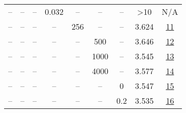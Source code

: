 \begin{table}[H]
\begin{tabular}{ccccccccc}
-- & -- & -- & 0.032 & -- & -- & -- & >10 & N/A \\
-- & -- & -- & -- & 256 & -- & -- & 3.624 & \href{https://wandb.ai/stanford-mercury/optimizer-scaling/runs/sweep-130m-2B-nadamw702024lr0.008-wd0.1-minlr0-warmup2000-b10.95-a5ebd4}{11} \\
-- & -- & -- & -- & -- & 500 & -- & 3.646 & \href{https://wandb.ai/stanford-mercury/optimizer-scaling/runs/sweep-130m-2B-nadamw25143blr0.008-wd0.1-minlr0-warmup500-b10.95--79c4c9}{12} \\
-- & -- & -- & -- & -- & 1000 & -- & 3.545 & \href{https://wandb.ai/stanford-mercury/optimizer-scaling/runs/sweep-130m-2B-nadamw973c1flr0.008-wd0.1-minlr0-warmup1000-b10.95-1c7190}{13} \\
-- & -- & -- & -- & -- & 4000 & -- & 3.577 & \href{https://wandb.ai/stanford-mercury/optimizer-scaling/runs/sweep-130m-2B-nadamw4becd7lr0.008-wd0.1-minlr0-warmup4000-b10.95-d4ab10}{14} \\
-- & -- & -- & -- & -- & -- & 0 & 3.547 & \href{https://wandb.ai/stanford-mercury/optimizer-scaling/runs/sweep-130m-2B-nadamwab5756lr0.008-wd0-minlr0-warmup2000-b10.95-b-6e00e5}{15} \\
-- & -- & -- & -- & -- & -- & 0.2 & 3.535 & \href{https://wandb.ai/stanford-mercury/optimizer-scaling/runs/sweep-130m-2B-nadamw2ed6cdlr0.008-wd0.2-minlr0-warmup2000-b10.95-1ea7c2}{16} \\
\bottomrule
\end{tabular}
\end{table}

